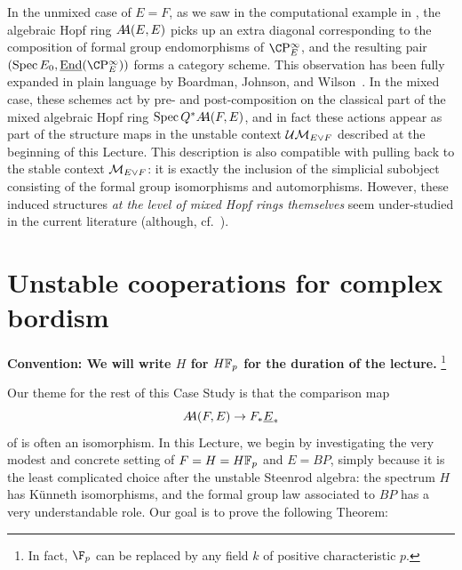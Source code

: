 \begin{remark}
In the unmixed case of \(E = F\), as we saw in the computational example in , the algebraic Hopf ring \(\AA(E, E)\) picks up an extra diagonal corresponding to the composition of formal group endomorphisms of \(\CP^\infty_E\), and the resulting pair \((\Spec E_0, \underline{\operatorname{End}}(\CP^\infty_E))\) forms a category scheme.
This observation has been fully expanded in plain language by Boardman, Johnson, and Wilson~\cite[Section 10]{BJW}.
In the mixed case, these schemes act by pre- and post-composition on the classical part of the mixed algebraic Hopf ring \(\Spec Q^* \AA(F, E)\), and in fact these actions appear as part of the structure maps in the unstable context \(\Ucontext{E \vee F}\) described at the beginning of this Lecture.
This description is also compatible with pulling back to the stable context \(\context{E \vee F}\): it is exactly the inclusion of the simplicial subobject consisting of the formal group isomorphisms and automorphisms.
However, these induced structures \emph{at the level of mixed Hopf rings themselves} seem under-studied in the current literature (although, cf.\ \cite[Remark 2.6]{HopkinsHunton}).
\end{remark}













\section{Unstable cooperations for complex bordism}\label{COableCoopnsII}

\begin{center}
\textbf{Convention: We will write \(H\) for \(\HFp\) for the duration of the lecture.}%
\footnote{%
In fact, \(\F_p\) can be replaced by any field \(k\) of positive characteristic \(p\).
}
\end{center}

Our theme for the rest of this Case Study is that the comparison map \[\AA(F, E) \to F_* \OS{E}{*}\] of  is often an isomorphism.
In this Lecture, we begin by investigating the very modest and concrete setting of \(F = H = \HFp\) and \(E = BP\), simply because it is the least complicated choice after the unstable Steenrod algebra: the spectrum \(H\) has K\"unneth isomorphisms, and the formal group law associated to \(BP\) has a very understandable role.
Our goal is to prove the following Theorem:

